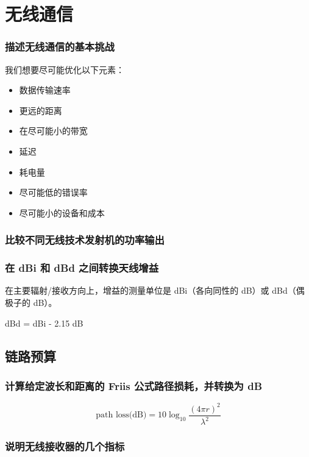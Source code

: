 \chapter{无线通信}

\subsection{描述无线通信的基本挑战}

我们想要尽可能优化以下元素：

\begin{itemize}
	\item 数据传输速率
	\item 更远的距离
	\item 在尽可能小的带宽
	\item 延迟
	\item 耗电量
	\item 尽可能低的错误率
	\item 尽可能小的设备和成本
\end{itemize}

\subsection{比较不同无线技术发射机的功率输出}

\subsection{在 dBi 和 dBd 之间转换天线增益}

在主要辐射/接收方向上，增益的测量单位是 dBi（各向同性的 dB）或 dBd（偶极子的 dB）。

dBd = dBi - 2.15 dB

\section{链路预算}

\subsection{计算给定波长和距离的 Friis 公式路径损耗，并转换为 dB}

\[\text{path loss(dB)} = 10 \log_{10}\frac{(4\pi r)^2}{\lambda^2}\]

\subsection{说明无线接收器的几个指标}


